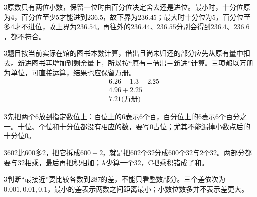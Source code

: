 \documentclass[multi=snippet,border={5bp 20bp 5bp 5bp}]{standalone}
\newenvironment{snippet}[3]{\begin{minipage}{#1bp}\color{answerred}\fontsize{#2}{#3}\selectfont\raggedright}{\end{minipage}}
\begin{document}
\begin{snippet}{505}{11.5}{14}\begin{multicols}{3}\raggedcolumns 原数只有两位小数，保留一位时由百分位决定舍去还是进位。最小时，十分位原为4，百分位至少5才能进到\(236.5\)\allowbreak ，故下界为\(236.45\)\allowbreak ；最大时十分位为5，百分位至多4才不进位，故上界为\(236.54\)\allowbreak 。再往外的\(236.44\)\allowbreak 、\(236.55\)\allowbreak 分别会得到\(236.4\)\allowbreak 、\(236.6\)\allowbreak ，都不符合。\end{multicols}\end{snippet}
\begin{snippet}{505}{11.5}{14}\begin{multicols}{3}\raggedcolumns 题目按当前实际在馆的图书本数计算，借出且尚未归还的部分应先从原有量中扣去。新进图书再增加到剩余量上，所以按“原有－借出＋新进”计算。三项都以万册为单位，可直接运算，结果也应保留万册。\[\begin{aligned}&6.26-1.3+2.25\\={}&4.96+2.25\\={}&7.21\text{(万册)}\end{aligned}\]\end{multicols}\end{snippet}
\begin{snippet}{505}{11.5}{14}\begin{multicols}{3}\raggedcolumns 先把两个6放到指定数位上：百位上的6表示6个百，百分位上的6表示6个百分之一。十位、个位和十分位都没有相应的数，要写0占位；尤其不能漏掉小数点后的十分位0。\end{multicols}\end{snippet}
\begin{snippet}{505}{11.5}{14}\begin{multicols}{3}\raggedcolumns 602比600多2，把它拆成\(600+2\)\allowbreak ，就是把602个32分成600个32与2个32。两部分都要与32相乘，最后再把积相加；A少算一个32，C把乘积错成了和。\end{multicols}\end{snippet}
\begin{snippet}{505}{11.5}{14}\begin{multicols}{3}\raggedcolumns 判断“最接近”要比较各数到287的差，不能只看整数部分。三个差依次为\(0.001,\allowbreak 0.01,\allowbreak 0.1\)\allowbreak ，最小的差表示两数之间距离最小；小数位数多并不表示差更大。\end{multicols}\end{snippet}
\end{document}
